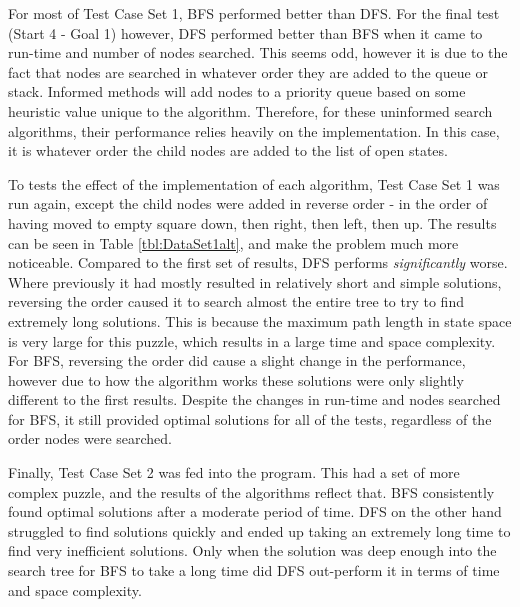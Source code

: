 \documentclass[12pt]{article}
\begin{document}
For most of Test Case Set 1, BFS performed better than DFS. For the final test (Start 4 - Goal 1) however, DFS performed better than BFS when it came to run-time and number of nodes searched. This seems odd, however it is due to the fact that nodes are searched in whatever order they are added to the queue or stack. Informed methods will add nodes to a priority queue based on some heuristic value unique to the algorithm. Therefore, for these uninformed search algorithms, their performance relies heavily on the implementation. In this case, it is whatever order the child nodes are added to the list of open states.

To tests the effect of the implementation of each algorithm, Test Case Set 1 was run again, except the child nodes were added in reverse order - in the order of having moved to empty square down, then right, then left, then up. The results can be seen in Table \ref{tbl:DataSet1alt}, and make the problem much more noticeable. Compared to the first set of results, DFS performs \emph{significantly} worse. Where previously it had mostly resulted in relatively short and simple solutions, reversing the order caused it to search almost the entire tree to try to find extremely long solutions. This is because the maximum path length in state space is very large for this puzzle, which results in a large time and space complexity. For BFS, reversing the order did cause a slight change in the performance, however due to how the algorithm works these solutions were only slightly different to the first results. Despite the changes in run-time and nodes searched for BFS, it still provided optimal solutions for all of the tests, regardless of the order nodes were searched.

Finally, Test Case Set 2 was fed into the program. This had a set of more complex puzzle, and the results of the algorithms reflect that. BFS consistently found optimal solutions after a moderate period of time. DFS on the other hand struggled to find solutions quickly and ended up taking an extremely long time to find very inefficient solutions. Only when the solution was deep enough into the search tree for BFS to take a long time did DFS out-perform it in terms of time and space complexity.
\end{document}
